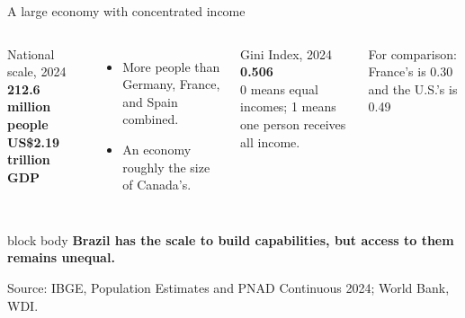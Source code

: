 \documentclass[10pt,aspectratio=169]{beamer}
\newcommand{\source}[1]{%
  \par\vfill{\tiny\color{MidGray}Source: #1}}
\newcommand{\muted}[1]{\textcolor{MidGray}{#1}}
\newcommand{\question}[1]{%
  \begin{beamercolorbox}[rounded=true,sep=0.55em,wd=\textwidth]{block body}
    \centering\large\textbf{#1}
  \end{beamercolorbox}}
\begin{document}
\begin{frame}{A large economy with concentrated income}
  \begin{columns}[T,onlytextwidth]
      \begin{block}{National scale, 2024}
        {\fontsize{22}{26}\selectfont\color{DeepNavy}\textbf{212.6 million people}}\\[.15cm]
        {\fontsize{22}{26}\selectfont\color{DeepNavy}\textbf{US\$2.19 trillion GDP}}
      \end{block}
      \vspace{.25cm}
      \begin{itemize}
        \item More people than Germany, France, and Spain combined.
        \item An economy roughly the size of Canada's.
      \end{itemize}
      \begin{exampleblock}{Gini Index, 2024}
        \centering
        {\fontsize{38}{42}\selectfont\color{Brick}\textbf{0.506}}\\[.1cm]
        \small 0 means equal incomes; 1 means one person receives all income.
      \end{exampleblock}
      \vspace{.15cm}
      \muted{For comparison: France's is 0.30 and the U.S.'s is 0.49}
  \end{columns}
  \vspace{.15cm}
  \question{Brazil has the scale to build capabilities, but access to them remains unequal.}
  \source{IBGE, Population Estimates and PNAD Continuous 2024; World Bank, WDI.}
\end{frame}
\end{document}
